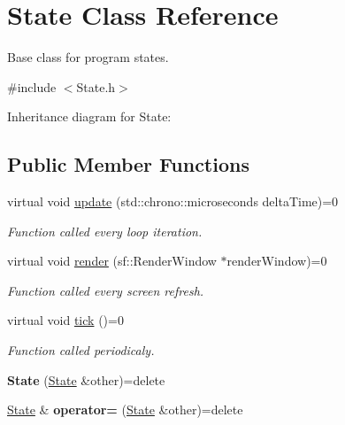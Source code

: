\hypertarget{classState}{\section{State Class Reference}
\label{classState}
}


Base class for program states.  




{\ttfamily \#include $<$State.\-h$>$}



Inheritance diagram for State\-:
\subsection*{Public Member Functions}
\begin{DoxyCompactItemize}
\item 
virtual void \hyperlink{classState_af2121f8eb52144b7a789214f15e3601a}{update} (std\-::chrono\-::microseconds delta\-Time)=0
\begin{DoxyCompactList}\small\item\em Function called every loop iteration. \end{DoxyCompactList}\item 
virtual void \hyperlink{classState_abea822ddf8d4a55439a0040eba979afb}{render} (sf\-::\-Render\-Window $\ast$render\-Window)=0
\begin{DoxyCompactList}\small\item\em Function called every screen refresh. \end{DoxyCompactList}\item 
virtual void \hyperlink{classState_a1cdec36e9ffad91ba7af560770601017}{tick} ()=0
\begin{DoxyCompactList}\small\item\em Function called periodicaly. \end{DoxyCompactList}\item 
\hypertarget{classState_a8fba10b9995ce898339f3b0d39234788}{{\bfseries State} (\hyperlink{classState}{State} \&other)=delete}\label{classState_a8fba10b9995ce898339f3b0d39234788}

\item 
\hypertarget{classState_a7ac6cc4de6723746df3dfb183b8eb84f}{\hyperlink{classState}{State} \& {\bfseries operator=} (\hyperlink{classState}{State} \&other)=delete}\label{classState_a7ac6cc4de6723746df3dfb183b8eb84f}

\end{DoxyCompactItemize}


